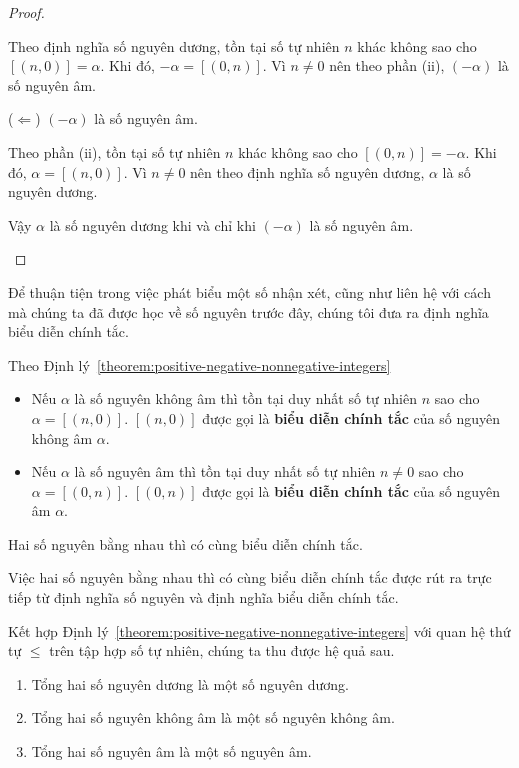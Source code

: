 \begin{proof}
\begin{enumerate}[label={(\roman*)}]
              Theo định nghĩa số nguyên dương, tồn tại số tự nhiên $n$ khác không sao cho $[(n, 0)] = \alpha$. Khi đó, $-\alpha = [(0, n)]$. Vì $n\ne 0$ nên theo phần (ii), $(-\alpha)$ là số nguyên âm.

              ($\Leftarrow$) $(-\alpha)$ là số nguyên âm.

              Theo phần (ii), tồn tại số tự nhiên $n$ khác không sao cho $[(0, n)] = -\alpha$. Khi đó, $\alpha = [(n, 0)]$. Vì $n\ne 0$ nên theo định nghĩa số nguyên dương, $\alpha$ là số nguyên dương.

              Vậy $\alpha$ là số nguyên dương khi và chỉ khi $(-\alpha)$ là số nguyên âm.
    \end{enumerate}
\end{proof}

Để thuận tiện trong việc phát biểu một số nhận xét, cũng như liên hệ với cách mà chúng ta đã được học về số nguyên trước đây, chúng tôi đưa ra định nghĩa biểu diễn chính tắc.
\begin{proposition}
    Theo Định lý~\ref{theorem:positive-negative-nonnegative-integers}
    \begin{itemize}
        \item Nếu $\alpha$ là số nguyên không âm thì tồn tại duy nhất số tự nhiên $n$ sao cho $\alpha = [(n, 0)]$. $[(n, 0)]$ được gọi là \textbf{biểu diễn chính tắc} của số nguyên không âm $\alpha$.
        \item Nếu $\alpha$ là số nguyên âm thì tồn tại duy nhất số tự nhiên $n\ne 0$ sao cho $\alpha = [(0, n)]$. $[(0, n)]$ được gọi là \textbf{biểu diễn chính tắc} của số nguyên âm $\alpha$.
    \end{itemize}

    Hai số nguyên bằng nhau thì có cùng biểu diễn chính tắc.
\end{proposition}

Việc hai số nguyên bằng nhau thì có cùng biểu diễn chính tắc được rút ra trực tiếp từ định nghĩa số nguyên và định nghĩa biểu diễn chính tắc.

Kết hợp Định lý~\ref{theorem:positive-negative-nonnegative-integers} với quan hệ thứ tự $\leq$ trên tập hợp số tự nhiên, chúng ta thu được hệ quả sau.

\begin{corollary}\label{corollary:positivity-negativity-nonnegativity-of-sum-of-integers}
    \begin{enumerate}[label={(\roman*)}]
        \item Tổng hai số nguyên dương là một số nguyên dương.
        \item Tổng hai số nguyên không âm là một số nguyên không âm.
        \item Tổng hai số nguyên âm là một số nguyên âm.
    \end{enumerate}
\end{corollary}

